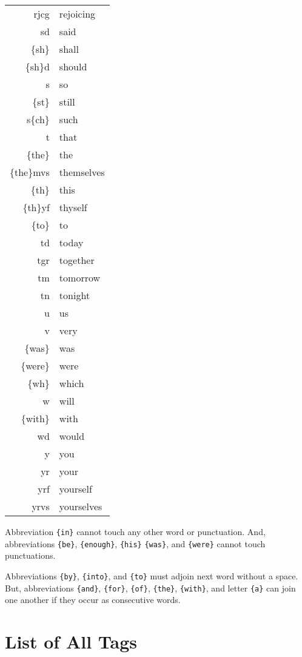 \documentclass[draft]{article}
\newcommand{\mytable}[1]{%
    \enskip\begin{tabular}[t]{r|l} 
    \hline #1 \hline
    \end{tabular}\enskip}
\begin{document}
\begin{center}
{}
\mytable{
rjcg&rejoicing \\
sd&said \\
\{sh\}&shall \\
\{sh\}d&should \\
s&so \\
\{st\}&still \\
s\{ch\}&such \\
t&that \\
\{the\}&the \\
\{the\}mvs&themselves \\
\{th\}&this \\
\{th\}yf&thyself \\
\{to\}&to \\
td&today \\
tgr&together \\
tm&tomorrow \\
tn&tonight \\
u&us \\
v&very \\
\{was\}&was \\
\{were\}&were \\
\{wh\}&which \\
w&will \\
\{with\}&with \\
wd&would \\
y&you \\
yr&your \\
yrf&yourself \\
yrvs&yourselves \\
}
\end{center}

Abbreviation \verb+{in}+ cannot touch any other word or punctuation.
And, abbreviations \verb+{be}+, \verb+{enough}+, \verb+{his}+
\verb+{was}+, and \verb+{were}+ cannot touch punctuations.  

Abbreviations \verb+{by}+, \verb+{into}+, and \verb+{to}+ must adjoin
next word without a space.  But, abbreviations \verb+{and}+,
\verb+{for}+, \verb+{of}+, \verb+{the}+, \verb+{with}+, and letter
\verb+{a}+ can join one another if they occur as consecutive words.


\section{List of All Tags}
\end{document}
